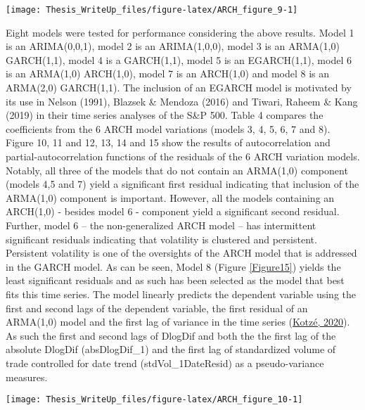 \documentclass[11pt,preprint, authoryear]{elsarticle}
\let\origfigure\figure
\let\endorigfigure\endfigure
\renewenvironment{figure}[1][2] {
    \expandafter\origfigure\expandafter[H]
} {
    \endorigfigure
}
\numberwithin{equation}{section}
\numberwithin{figure}{section}
\numberwithin{table}{section}
\begin{document}
\begin{figure}[H]

{\centering \texttt{[image: Thesis\_WriteUp\_files/figure-latex/ARCH\_figure\_9-1]} 

}

\caption{Autocorrelation and partial-autocorrelation functions of absolute LogDiff \label{Figure9}}\label{fig:ARCH_figure_9}
\end{figure}

Eight models were tested for performance considering the above results.
Model 1 is an ARIMA(0,0,1), model 2 is an ARIMA(1,0,0), model 3 is an
ARMA(1,0) GARCH(1,1), model 4 is a GARCH(1,1), model 5 is an
EGARCH(1,1), model 6 is an ARMA(1,0) ARCH(1,0), model 7 is an ARCH(1,0)
and model 8 is an ARMA(2,0) GARCH(1,1). The inclusion of an EGARCH model
is motivated by its use in Nelson (1991), Blazsek \& Mendoza (2016) and
Tiwari, Raheem \& Kang (2019) in their time series analyses of the S\&P
500. Table 4 compares the coefficients from the 6 ARCH model variations
(models 3, 4, 5, 6, 7 and 8). Figure 10, 11 and 12, 13, 14 and 15 show
the results of autocorrelation and partial-autocorrelation functions of
the residuals of the 6 ARCH variation models. Notably, all three of the
models that do not contain an ARMA(1,0) component (models 4,5 and 7)
yield a significant first residual indicating that inclusion of the
ARMA(1,0) component is important. However, all the models containing an
ARCH(1,0) - besides model 6 - component yield a significant second
residual. Further, model 6 -- the non-generalized ARCH model -- has
intermittent significant residuals indicating that volatility is
clustered and persistent. Persistent volatility is one of the oversights
of the ARCH model that is addressed in the GARCH model. As can be seen,
Model 8 (Figure \ref{Figure15}) yields the least significant residuals
and as such has been selected as the model that best fits this time
series. The model linearly predicts the dependent variable using the
first and second lags of the dependent variable, the first residual of
an ARMA(1,0) model and the first lag of variance in the time series
(\protect\hyperlink{ref-kotze2020univariate}{Kotzé, 2020}). As such the
first and second lags of DlogDif and both the the first lag of the
absolute DlogDif (absDlogDif\_1) and the first lag of standardized
volume of trade controlled for date trend (stdVol\_1DateResid) as a
pseudo-variance measures.

\begin{figure}[H]

{\centering \texttt{[image: Thesis\_WriteUp\_files/figure-latex/ARCH\_figure\_10-1]} 

}

\caption{Autocorrelation and partial-autocorrelation functions of model 3 - ARMA(1,0) GARCH(1,1) - residuals \label{Figure10}}\label{fig:ARCH_figure_10}
\end{figure}
\end{document}
